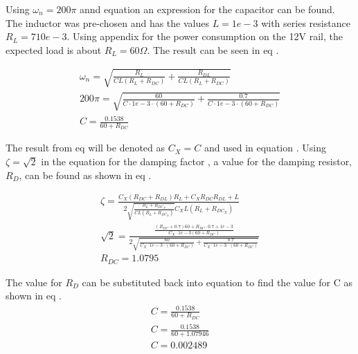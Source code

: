 Using $\omega_n = 200\pi$ annd equation  an expression for the capacitor can be found. The inductor was pre-chosen and has the values $L = 1e-3$ with series resistance $R_L = 710e-3$. Using appendix  for the power consumption on the 12V rail, the expected load is about $R_L = 60 \Omega$. The result can be seen in eq .

\begin{equation}\label{eq:7_1_5_COMP1} 
    \begin{aligned}
        \omega_n = \sqrt{\frac{R_L}{CL(R_L + R_{DC})} + \frac{R_{DL}}{CL(R_L+R_{DC})}}\\
        200\pi = \sqrt{\frac{60}{C\cdot 1e-3 \cdot(60 + R_{DC})} + \frac{0.7}{C\cdot 1e-3 \cdot (60 + R_{DC})}}\\
        C = \frac{0.1538}{60 + R_{DC}}
    \end{aligned}
\end{equation}

The result from eq  will be denoted as $C_X = C$ and used in equation . Using $\zeta = \sqrt{2}$ in the equation for the damping factor , a value for the damping resistor, $R_D$, can be found as shown in eq .

\begin{equation}\label{eq:7_1_5_COMP2} 
    \begin{aligned}
        \zeta = \frac{C_X(R_{DC}+R_{DL})R_L + C_XR_{DC}R_{DL} + L}{2\sqrt{\frac{R_L +R_{DC_X}}{CL(R_L + R_{DC_X})}}C_XL(R_L+R_{DC_X})}\\
        \sqrt{2} = \frac{  \frac{(R_{DC} + 0.7)60 + R_{DC}\cdot 0.7 + 1e-3}{C_X \cdot 1e-3(60 + R_{DC})}  }{2\sqrt{ \frac{60}{C_X \cdot 1e-3 \cdot (60+R_{DC})} + \frac{0.7}{C_X \cdot 1e-3 \cdot (60+R_{DC})} }}\\
        R_{DC} = 1.0795
    \end{aligned}
\end{equation}

The value for $R_D$ can be substituted back into equation  to find the value for C as shown in eq .
\begin{equation}\label{eq:7_1_5_COMP3} 
    \begin{aligned}
        C = \frac{0.1538}{60 + R_{DC}}\\
        C = \frac{0.1538}{60 + 1.07946}\\  
        C = 0.002489
    \end{aligned}
\end{equation}

